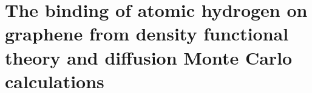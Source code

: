 \chapter{The binding of atomic hydrogen on graphene from density functional theory and diffusion Monte Carlo calculations}







